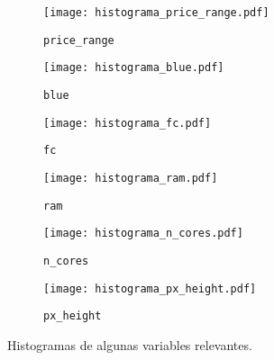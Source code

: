 \documentclass[12pt,twocolumn,a4paper]{apa_article}
\begin{document}
\begin{figure*}
  \centering
  \captionsetup{width=0.9\textwidth}
  \begin{subfigure}{0.85\columnwidth}
    \centering
    \texttt{[image: histograma\_price\_range.pdf]}
    \caption{\texttt{price\_range}}
    \label{fig:histpricerange}
  \end{subfigure}%
  \begin{subfigure}{0.9\columnwidth}
    \centering
    \texttt{[image: histograma\_blue.pdf]}
    \caption{\texttt{blue}}
    \label{fig:histblue}
  \end{subfigure}

  \begin{subfigure}{0.9\columnwidth}
    \centering
    \texttt{[image: histograma\_fc.pdf]}
    \caption{\texttt{fc}}
    \label{fig:histfc}
  \end{subfigure}%
  \begin{subfigure}{0.9\columnwidth}
    \centering
    \texttt{[image: histograma\_ram.pdf]}
    \caption{\texttt{ram}}
    \label{fig:ram}
  \end{subfigure}%
  
  \begin{subfigure}{0.9\columnwidth}
    \centering
    \texttt{[image: histograma\_n\_cores.pdf]}
    \caption{\texttt{n\_cores}}
    \label{fig:histncores}
  \end{subfigure}%
  \begin{subfigure}{0.9\columnwidth}
    \centering
    \texttt{[image: histograma\_px\_height.pdf]}
    \caption{\texttt{px\_height}}
    \label{fig:histpxheight}
  \end{subfigure}%
  
  \vspace{-10pt}
  \caption[
    Histogramas de algunas variables relevantes.
  ]{%
    Histogramas de algunas variables relevantes.
  }%
  \label{fig:histogramas}	
\end{figure*}
\printbibliography
\end{document}
